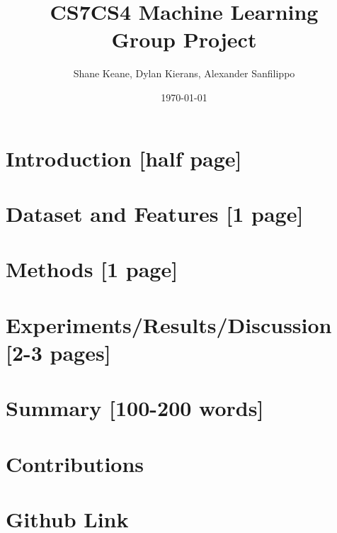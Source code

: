 \documentclass[10pt, a4]{article} %
\title{ CS7CS4 Machine Learning\\Group Project}
\author{Shane Keane, Dylan Kierans, Alexander Sanfilippo}
\date{\today}
\begin{document}
\maketitle{}

\section*{Introduction [half page]}
\section*{Dataset and Features [1 page]}
\section*{Methods [1 page]}
\section*{Experiments/Results/Discussion [2-3 pages]}
\section*{Summary [100-200 words]}
\section*{Contributions}
\section*{Github Link}
\end{document}
